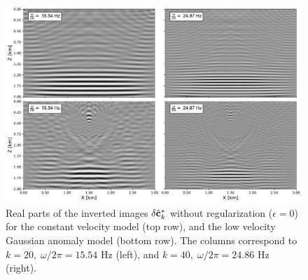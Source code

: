 \begin{figure}[h]
\centering
\includegraphics[width=\linewidth]{Fig/inverted-images-noreg-comparison.pdf}

\vspace*{-0.4cm}
\caption{Real parts of the inverted images $\delta \hat{\mathbf{c}}^{\ast}_k$ without regularization ($\epsilon = 0$) for the constant velocity model (top row), and the low velocity Gaussian anomaly model (bottom row). The columns correspond to $k = 20,\; \omega / 2 \pi = 15.54$ Hz (left), and $k = 40,\; \omega / 2 \pi = 24.86$ Hz (right).}
\label{fig:example1_noreg_comp}
\end{figure}